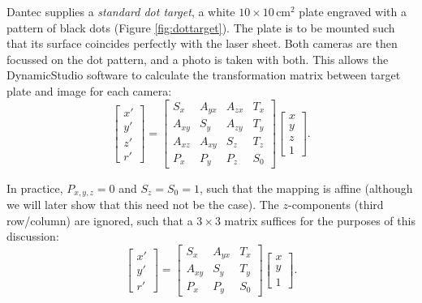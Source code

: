 \documentclass[10pt]{book}
\begin{document}
Dantec supplies a \emph{standard dot target}, a white $10 \times 10\,
\mathrm{cm}^2$ plate engraved with a pattern of black dots (Figure
\ref{fig:dottarget}). The plate is to be mounted such that its surface coincides
perfectly with the laser sheet. Both cameras are then focussed on the dot
pattern, and a photo is taken with both. This allows the DynamicStudio software
to calculate the transformation matrix between target plate and
image for each camera:
\begin{equation}
\left[\begin{array}{c} x'\\ y'\\ z'\\ r' \end{array} \right]
=
\left[ \begin{array}{cccc}
S_x & A_{yx} & A_{zx} & T_x \\
A_{xy} & S_y & A_{zy} & T_y \\
A_{xz} & A_{xy} & S_z & T_z \\
P_x & P_y & P_z & S_0
\end{array} \right]
\left[ \begin{array}{c} x\\ y \\ z \\ 1 \end{array} \right].
\end{equation}

In practice, $P_{x,y,z} = 0$ and $S_z = S_0 = 1$, such that the mapping is
affine (although we will later show that this need not be the case). The
$z$-components (third row/column) are ignored, such that a $3 \times 3$ matrix
suffices for the purposes of this discussion:
\begin{equation}
\left[\begin{array}{c} x'\\ y'\\ r' \end{array} \right]
=
\left[ \begin{array}{ccc}
S_x & A_{yx} &  T_x \\
A_{xy} & S_y &  T_y \\
P_x & P_y & S_0
\end{array} \right]
\left[ \begin{array}{c} x\\ y \\ 1 \end{array} \right].
\end{equation}
\end{document}

